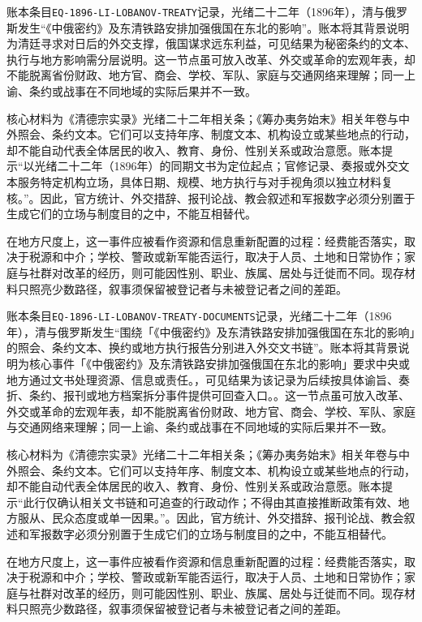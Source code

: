 账本条目\texttt{EQ-1896-LI-LOBANOV-TREATY}记录，光绪二十二年（1896年），清与俄罗斯发生“《中俄密约》及东清铁路安排加强俄国在东北的影响”。账本将其背景说明为清廷寻求对日后的外交支撑，俄国谋求远东利益，可见结果为秘密条约的文本、执行与地方影响需分层说明。这一节点虽可放入改革、外交或革命的宏观年表，却不能脱离省份财政、地方官、商会、学校、军队、家庭与交通网络来理解；同一上谕、条约或战事在不同地域的实际后果并不一致。

核心材料为《清德宗实录》光绪二十二年相关条；《筹办夷务始末》相关年卷与中外照会、条约文本。它们可以支持年序、制度文本、机构设立或某些地点的行动，却不能自动代表全体居民的收入、教育、身份、性别关系或政治意愿。账本提示“以光绪二十二年（1896年）的同期文书为定位起点；官修记录、奏报或外交文本服务特定机构立场，具体日期、规模、地方执行与对手视角须以独立材料复核。”。因此，官方统计、外交措辞、报刊论战、教会叙述和军报数字必须分别置于生成它们的立场与制度目的之中，不能互相替代。

在地方尺度上，这一事件应被看作资源和信息重新配置的过程：经费能否落实，取决于税源和中介；学校、警政或新军能否运行，取决于人员、土地和日常协作；家庭与社群对改革的经历，则可能因性别、职业、族属、居处与迁徙而不同。现存材料只照亮少数路径，叙事须保留被登记者与未被登记者之间的差距。

账本条目\texttt{EQ-1896-LI-LOBANOV-TREATY-DOCUMENTS}记录，光绪二十二年（1896年），清与俄罗斯发生“围绕「《中俄密约》及东清铁路安排加强俄国在东北的影响」的照会、条约文本、换约或地方执行报告分别进入外交文书链”。账本将其背景说明为核心事件「《中俄密约》及东清铁路安排加强俄国在东北的影响」要求中央或地方通过文书处理资源、信息或责任。，可见结果为该记录为后续按具体谕旨、奏折、条约、报刊或地方档案拆分事件提供可回查入口。。这一节点虽可放入改革、外交或革命的宏观年表，却不能脱离省份财政、地方官、商会、学校、军队、家庭与交通网络来理解；同一上谕、条约或战事在不同地域的实际后果并不一致。

核心材料为《清德宗实录》光绪二十二年相关条；《筹办夷务始末》相关年卷与中外照会、条约文本。它们可以支持年序、制度文本、机构设立或某些地点的行动，却不能自动代表全体居民的收入、教育、身份、性别关系或政治意愿。账本提示“此行仅确认相关文书链和可追查的行政动作；不得由其直接推断政策有效、地方服从、民众态度或单一因果。”。因此，官方统计、外交措辞、报刊论战、教会叙述和军报数字必须分别置于生成它们的立场与制度目的之中，不能互相替代。

在地方尺度上，这一事件应被看作资源和信息重新配置的过程：经费能否落实，取决于税源和中介；学校、警政或新军能否运行，取决于人员、土地和日常协作；家庭与社群对改革的经历，则可能因性别、职业、族属、居处与迁徙而不同。现存材料只照亮少数路径，叙事须保留被登记者与未被登记者之间的差距。

